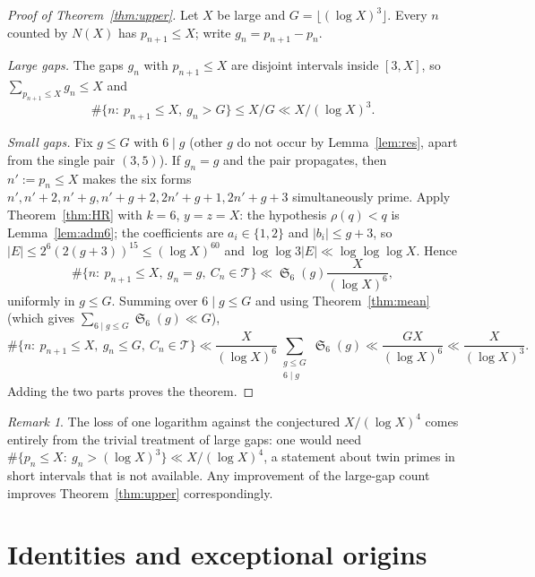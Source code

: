 \documentclass[11pt,a4paper]{article}
\theoremstyle{plain}
\theoremstyle{definition}
\theoremstyle{remark}
\newtheorem{remark}[theorem]{Remark}
\newcommand{\Tset}{\mathcal{T}}
\DeclareMathOperator{\Sing}{\mathfrak S}
\begin{document}
\begin{proof}[Proof of Theorem~\ref{thm:upper}]
Let $X$ be large and $G=\lfloor(\log X)^3\rfloor$.  Every $n$ counted by
$N(X)$ has $p_{n+1}\le X$; write $g_n=p_{n+1}-p_n$.

\emph{Large gaps.}  The gaps $g_n$ with $p_{n+1}\le X$ are disjoint
intervals inside $[3,X]$, so $\sum_{p_{n+1}\le X}g_n\le X$ and
\[
\#\{n:\ p_{n+1}\le X,\ g_n>G\}\le X/G\ll X/(\log X)^3 .
\]

\emph{Small gaps.}  Fix $g\le G$ with $6\mid g$ (other $g$ do not occur by
Lemma~\ref{lem:res}, apart from the single pair $(3,5)$).  If $g_n=g$ and
the pair propagates, then $n':=p_n\le X$ makes the six forms
$n',n'+2,n'+g,n'+g+2,2n'+g+1,2n'+g+3$ simultaneously prime.  Apply
Theorem~\ref{thm:HR} with $k=6$, $y=z=X$: the hypothesis $\rho(q)<q$ is
Lemma~\ref{lem:adm6}; the coefficients are $a_i\in\{1,2\}$ and
$|b_i|\le g+3$, so $|E|\le2^6(2(g+3))^{15}\le(\log X)^{60}$ and
$\log\log3|E|\ll\log\log\log X$.  Hence
\[
\#\{n:\ p_{n+1}\le X,\ g_n=g,\ C_n\in\Tset\}\ll\Sing_6(g)\frac{X}{(\log X)^6},
\]
uniformly in $g\le G$.  Summing over $6\mid g\le G$ and using
Theorem~\ref{thm:mean} (which gives $\sum_{6\mid g\le G}\Sing_6(g)\ll G$),
\[
\#\{n:\ p_{n+1}\le X,\ g_n\le G,\ C_n\in\Tset\}\ll\frac{X}{(\log X)^6}\sum_{\substack{g\le G\\6\mid g}}\Sing_6(g)
\ll\frac{GX}{(\log X)^6}\ll\frac{X}{(\log X)^3}.
\]
Adding the two parts proves the theorem.
\end{proof}

\begin{remark}
The loss of one logarithm against the conjectured $X/(\log X)^4$ comes
entirely from the trivial treatment of large gaps: one would need
$\#\{p_n\le X:\ g_n>(\log X)^{3}\}\ll X/(\log X)^{4}$, a statement about
twin primes in short intervals that is not available.  Any improvement of
the large-gap count improves Theorem~\ref{thm:upper} correspondingly.
\end{remark}

\section{Identities and exceptional origins}
\end{document}
